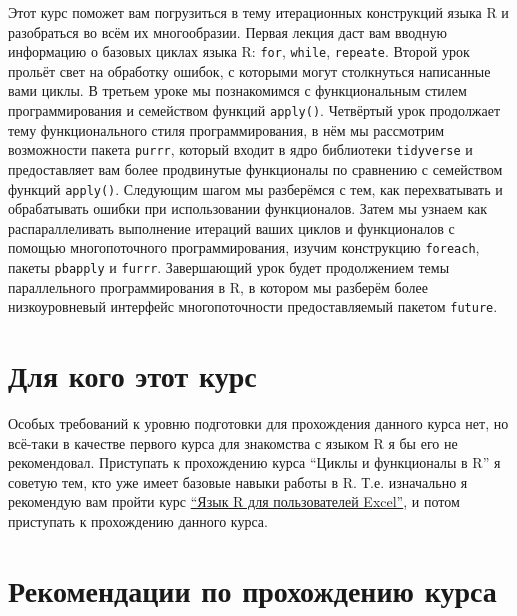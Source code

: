 \documentclass[
]{book}
\begin{document}
Этот курс поможет вам погрузиться в тему итерационных конструкций языка R и разобраться во всём их многообразии. Первая лекция даст вам вводную информацию о базовых циклах языка R: \texttt{for}, \texttt{while}, \texttt{repeate}. Второй урок прольёт свет на обработку ошибок, с которыми могут столкнуться написанные вами циклы. В третьем уроке мы познакомимся с функциональным стилем программирования и семейством функций \texttt{apply()}. Четвёртый урок продолжает тему функционального стиля программирования, в нём мы рассмотрим возможности пакета \texttt{purrr}, который входит в ядро библиотеки \texttt{tidyverse} и предоставляет вам более продвинутые функционалы по сравнению с семейством функций \texttt{apply()}. Следующим шагом мы разберёмся с тем, как перехватывать и обрабатывать ошибки при использовании функционалов. Затем мы узнаем как распараллеливать выполнение итераций ваших циклов и функционалов с помощью многопоточного программирования, изучим конструкцию \texttt{foreach}, пакеты \texttt{pbapply} и \texttt{furrr}. Завершающий урок будет продолжением темы параллельного программирования в R, в котором мы разберём более низкоуровневый интерфейс многопоточности предоставляемый пакетом \texttt{future}.

\hypertarget{ux434ux43bux44f-ux43aux43eux433ux43e-ux44dux442ux43eux442-ux43aux443ux440ux441}{%
\section*{Для кого этот курс}\label{ux434ux43bux44f-ux43aux43eux433ux43e-ux44dux442ux43eux442-ux43aux443ux440ux441}}

Особых требований к уровню подготовки для прохождения данного курса нет, но всё-таки в качестве первого курса для знакомства с языком R я бы его не рекомендовал. Приступать к прохождению курса ``Циклы и функционалы в R'' я советую тем, кто уже имеет базовые навыки работы в R. Т.е. изначально я рекомендую вам пройти курс \href{https://selesnow.github.io/r4excel_users/}{``Язык R для пользователей Excel''}, и потом приступать к прохождению данного курса.

\hypertarget{ux440ux435ux43aux43eux43cux435ux43dux434ux430ux446ux438ux438-ux43fux43e-ux43fux440ux43eux445ux43eux436ux434ux435ux43dux438ux44e-ux43aux443ux440ux441ux430}{%
\section*{Рекомендации по прохождению курса}\label{ux440ux435ux43aux43eux43cux435ux43dux434ux430ux446ux438ux438-ux43fux43e-ux43fux440ux43eux445ux43eux436ux434ux435ux43dux438ux44e-ux43aux443ux440ux441ux430}}
\end{document}
